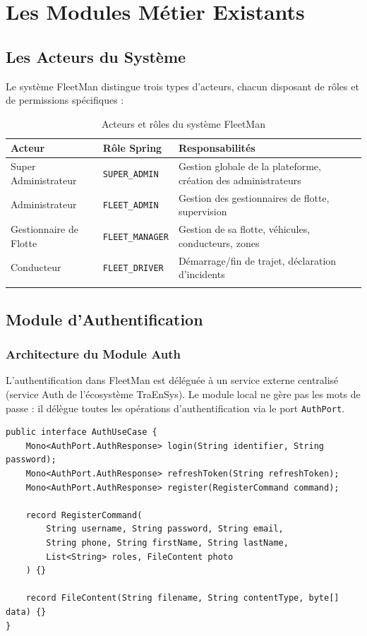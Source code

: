 \documentclass[12pt,a4paper]{report}
\begin{document}
\chapter{Les Modules Métier Existants}

\section{Les Acteurs du Système}

Le système FleetMan distingue trois types d'acteurs, chacun disposant de rôles et de permissions spécifiques :

\begin{longtable}{p{3.5cm}p{3cm}p{7cm}}
\toprule
\textbf{Acteur} & \textbf{Rôle Spring} & \textbf{Responsabilités} \\
\midrule
\endhead
Super Administrateur & \texttt{SUPER\_ADMIN} & Gestion globale de la plateforme, création des administrateurs \\
Administrateur & \texttt{FLEET\_ADMIN} & Gestion des gestionnaires de flotte, supervision \\
Gestionnaire de Flotte & \texttt{FLEET\_MANAGER} & Gestion de sa flotte, véhicules, conducteurs, zones \\
Conducteur & \texttt{FLEET\_DRIVER} & Démarrage/fin de trajet, déclaration d'incidents \\
\bottomrule
\caption{Acteurs et rôles du système FleetMan}
\end{longtable}

\section{Module d'Authentification}

\subsection{Architecture du Module Auth}

L'authentification dans FleetMan est déléguée à un service externe centralisé (service Auth de l'écosystème TraEnSys). Le module local ne gère pas les mots de passe : il délègue toutes les opérations d'authentification via le port \texttt{AuthPort}.

\begin{lstlisting}[style=javaStyle, caption={Interface AuthUseCase — Port entrant d'authentification}]
public interface AuthUseCase {
    Mono<AuthPort.AuthResponse> login(String identifier, String password);
    Mono<AuthPort.AuthResponse> refreshToken(String refreshToken);
    Mono<AuthPort.AuthResponse> register(RegisterCommand command);

    record RegisterCommand(
        String username, String password, String email,
        String phone, String firstName, String lastName,
        List<String> roles, FileContent photo
    ) {}

    record FileContent(String filename, String contentType, byte[] data) {}
}
\end{lstlisting}
\end{document}
